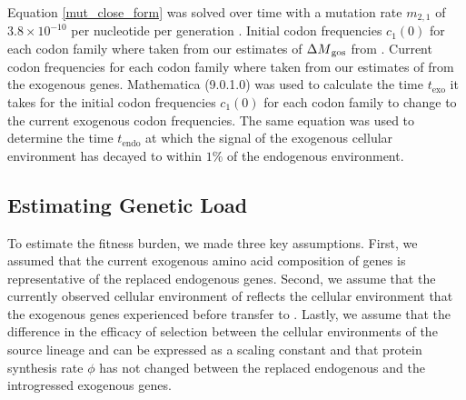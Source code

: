 Equation \ref{mut_close_form} was solved over time with a mutation rate $m_{2,1}$ of $3.8\times 10^{-10}$ per nucleotide per generation \citep{lang2008}. 
Initial codon frequencies $c_1(0)$ for each codon family where taken from our estimates of ${\Delta M}_\text{gos}$ from \gossypii. 
Current codon frequencies for each codon family where taken from our estimates of \DM from the exogenous genes.
Mathematica (9.0.1.0) \citep{Mathematica} was used to calculate the time $t_\text{exo}$ it takes for the initial codon frequencies $c_1(0)$ for each codon family to change to the current exogenous codon frequencies.
The same equation was used to determine the time $t_\text{endo}$ at which the signal of the exogenous cellular environment has decayed to within $1 \%$ of the endogenous environment.

\subsection*{Estimating Genetic Load}

To estimate the fitness burden, we made three key assumptions.
First, we assumed that the current exogenous amino acid composition of genes is representative of the replaced endogenous genes.
Second, we assume that the currently observed cellular environment of \gossypii reflects the cellular environment that the exogenous genes experienced before transfer to \kluyveri.
Lastly, we assume that the difference in the efficacy of selection between the cellular environments of the source lineage and \kluyveri can be expressed as a scaling constant and that protein synthesis rate $\phi$ has not changed between the replaced endogenous and the introgressed exogenous genes.

